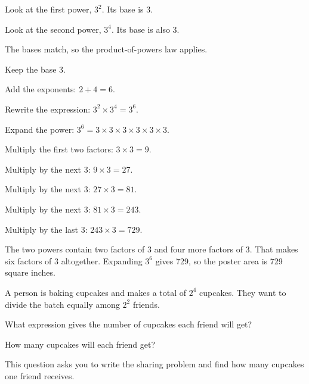 \begin{steps}
  \item Look at the first power, $3^{2}$. Its base is 3.
  \item Look at the second power, $3^{4}$. Its base is also 3.
  \item The bases match, so the product-of-powers law applies.
  \item Keep the base 3.
  \item Add the exponents: $2 + 4 = 6$.
  \item Rewrite the expression: $3^{2} \times 3^{4} = 3^{6}$.
  \item Expand the power: $3^{6} = 3 \times 3 \times 3 \times 3 \times 3 \times 3$.
  \item Multiply the first two factors: $3 \times 3 = 9$.
  \item Multiply by the next 3: $9 \times 3 = 27$.
  \item Multiply by the next 3: $27 \times 3 = 81$.
  \item Multiply by the next 3: $81 \times 3 = 243$.
  \item Multiply by the last 3: $243 \times 3 = 729$.
\end{steps}


The two powers contain two factors of 3 and four more factors of 3. That makes
six factors of 3 altogether. Expanding $3^{6}$ gives 729, so the poster area is
729 square inches.


A person is baking cupcakes and makes a total of $2^{4}$ cupcakes. They want to
divide the batch equally among $2^{2}$ friends.
\par\noindent{}What expression gives the number of cupcakes each
friend will get?
\par\noindent{}How many cupcakes will each friend get?


This question asks you to write the sharing problem and find how many cupcakes
one friend receives.

